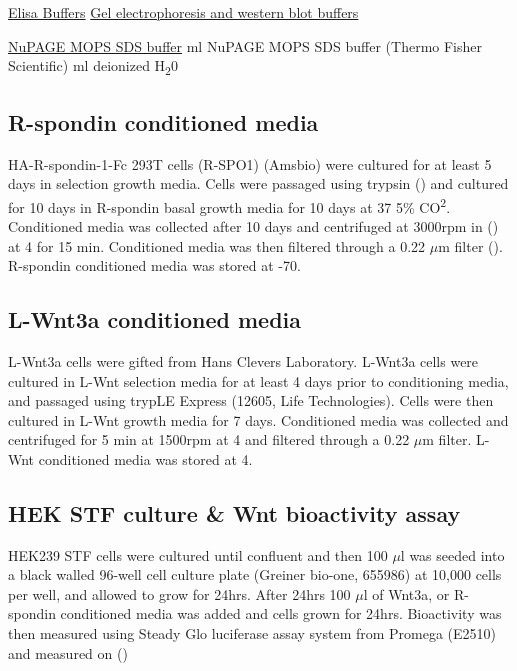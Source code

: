 \documentclass[a4paper]{report}
\begin{document}
\begin{indentlist}
\vspace{2mm}\newline\underline{Elisa Buffers}
\vspace{2mm}\newline\underline{Gel electrophoresis and western blot buffers}
\begin{adjustwidth}{10mm}
\vspace{2mm}\newline\underline{NuPAGE MOPS SDS buffer}
\vspace{2mm} ml NuPAGE MOPS SDS buffer (Thermo Fisher Scientific)
 ml deionized H\textsubscript{2}0

\end{adjustwidth}

\end{indentlist}




\subsection{R-spondin conditioned media}
\justifying
HA-R-spondin-1-Fc 293T cells (R-SPO1) (Amsbio) were cultured for at least 5 days in selection growth media. Cells were passaged using trypsin () and cultured for 10 days in R-spondin basal growth media for 10 days at 37 5\% CO\textsuperscript{2}. Conditioned media was collected after 10 days and centrifuged at 3000rpm in () at 4 for 15 min. Conditioned media was then filtered through a 0.22 $\mu$m filter (). R-spondin conditioned media was stored at -70. 
\subsection{L-Wnt3a conditioned media}
\justifying
L-Wnt3a cells were gifted from Hans Clevers Laboratory. L-Wnt3a cells were cultured in L-Wnt selection media for at least 4 days prior to conditioning media, and passaged using trypLE Express (12605, Life Technologies). Cells were then cultured in L-Wnt growth media for 7 days. Conditioned media was collected and centrifuged for 5 min at 1500rpm at 4 and filtered through a 0.22 $\mu$m filter. L-Wnt conditioned media was stored at 4. 
\subsection{HEK STF culture \& Wnt bioactivity assay}
HEK239 STF cells were cultured until confluent and then 100 $\mu$l was seeded into a black walled 96-well cell culture plate (Greiner bio-one, 655986) at 10,000 cells per well, and allowed to grow for 24hrs. After 24hrs 100 $\mu$l of Wnt3a, or R-spondin conditioned media was added and cells grown for 24hrs. Bioactivity was then measured using Steady Glo luciferase assay system from Promega (E2510) and measured on ()
\end{document}
